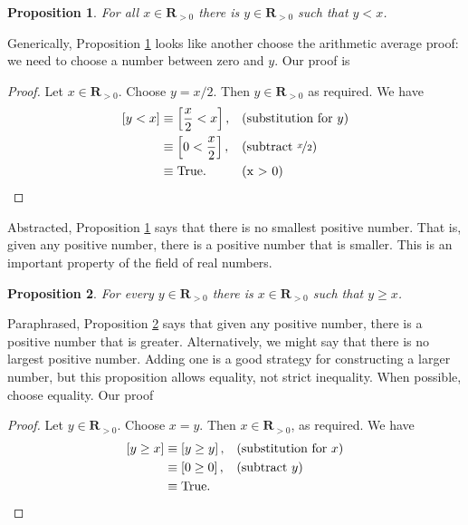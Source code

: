 \documentclass[12pt,fleqn,answers]{article}
\newcommand{\reals}{\mathbf{R}}
\newcommand{\true}{\mathrm{True}}
\newenvironment{myproof}
  {\begin{shaded}\begin{proof}}
  {\end{proof}\end{shaded}}
\newtheorem{prop}{Proposition}
\begin{document}
    \begin{prop}   For all $x \in \reals_{>0}$ there is 
      $y \in \reals_{> 0}$ such that $y < x$.  \label{p3}
    \end{prop}
     
    \noindent Generically, Proposition \ref{p3} looks like another choose the arithmetic average proof: we need to choose a number between zero and $y$. Our proof is
      
      \begin{myproof}  Let $x \in \reals_{>0}$. Choose $y = x/2$. Then $y \in \reals_{>0}$ as required. We have
         \begin{align*}
         \left[y < x \right] &\equiv \left[\frac{x}{2} < x \right], &&\text{(substitution for $y$)} \\
                                   &\equiv \left[0 < \frac{x}{2}  \right], &&\text{(subtract $\nicefrac{x}{2}$)} \\
                                   &\equiv \true.  &&\text{(x > 0)} \qedhere
      \end{align*}
      \end{myproof}
\noindent Abstracted, Proposition \ref{p3} says that there is no smallest positive number. That is, given any positive number, there is a 
positive number that is smaller.  This is an important property of the field of real numbers.
       

       \begin{prop} For every $y \in \reals_{> 0}$ there is  
        $x \in \reals_{>0}$ such that $y \geq  x$. \label{p4}
      \end{prop}
      \noindent Paraphrased, Proposition \ref{p4} says that given any positive number, there is a positive number that is greater. Alternatively, we
      might say that there is no largest positive number. Adding one is a good strategy for constructing a larger number, but this proposition
      allows equality, not strict inequality.  When possible, choose equality. Our proof
      
       \begin{myproof} Let $y \in \reals_{>0}$. Choose $x = y$. Then $x \in \reals_{>0}$, as 
        required. We have
       \begin{align*}
         \left[y \geq x  \right] &\equiv \left[y \geq  y \right], && \text{(substitution for $x$)} \\
                                      &\equiv \left[0 \geq 0 \right], &&\text{(subtract $y$)} \\
                                      &\equiv \true. && \qedhere
       \end{align*}
       
       \end{myproof}
\end{document}

